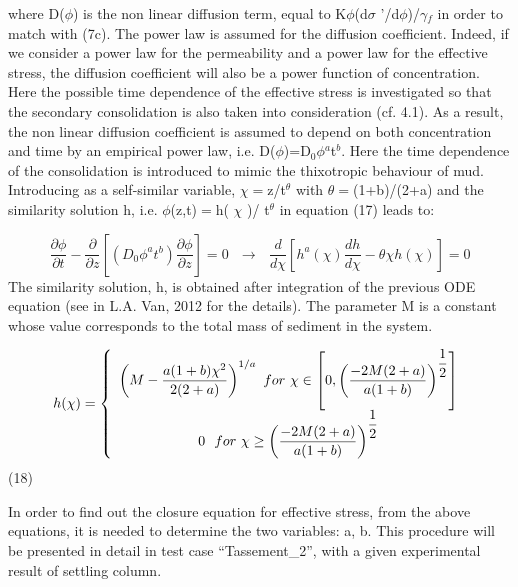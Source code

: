 where D($\phi$) is the non linear diffusion term, equal to K$\phi$(d$\sigma$%
'/d$\phi$)/$\gamma$$_{f}$ in order to match with (7c).\newline
The power law is assumed for the diffusion coefficient. Indeed, if we
consider a power law for the permeability and a power law for the effective
stress, the diffusion coefficient will also be a power function of
concentration. Here the possible time dependence of the effective stress is
investigated so that the secondary consolidation is also taken into
consideration (cf. 4.1). As a result, the non linear diffusion coefficient
is assumed to depend on both concentration and time by an empirical power
law, i.e. D($\phi$)=D$_{0}$$\phi$$^{a}$t$^{b}$. Here the time dependence of
the consolidation is introduced to mimic the thixotropic behaviour of mud.
Introducing as a self-similar variable, $\chi$$=$z/t$^{\theta }$ with $\theta
$$=$(1+b)/(2+a) and the similarity solution h, i.e. $\phi$(z,t)$=$h( $\chi$%
)/ t$^{\theta }$ in equation (17) leads to:

\begin{equation*}
\dfrac{\partial \phi }{\partial t} -\dfrac{\partial }{\partial z} \left[
\left( D_{0} \phi ^{a} t^{b} \right) \dfrac{\partial \phi }{\partial z} %
\right] =0\text{\ \ } \rightarrow \text{\ \ } \dfrac{d}{d\chi } \left[ h^{a}
(\chi )\dfrac{dh}{d\chi } -\theta \chi h(\chi )\right] =0 
\end{equation*}
The similarity solution, h, is obtained after integration of the previous
ODE equation (see in L.A. Van, 2012 for the details). The parameter M is a
constant whose value corresponds to the total mass of sediment in the system.

\begin{equation*}
h(\chi )=\left\{ 
\begin{array}{c}
\left( M-\dfrac{a(1+b)\chi _{}^{2} }{2(2+a)} \right) ^{1/a} \text{\ } for%
\text{\ } \chi \in \left[ 0,\left( \dfrac{-2M(2+a)}{a(1+b)} \right) ^{\dfrac{%
1}{2} } \right] \\ 
0\text{\ \ } for\text{\ } \chi \geq \left( \dfrac{-2M(2+a)}{a(1+b)} \right)
^{\dfrac{1}{2} }%
\end{array}
\right. 
\end{equation*}%
\hspace{5mm} \hspace{5mm} (18)

In order to find out the closure equation for effective stress, from the
above equations, it is needed to determine the two variables: a, b. This
procedure will be presented in detail in test case ``Tassement\_2'', with a
given experimental result of settling column.

